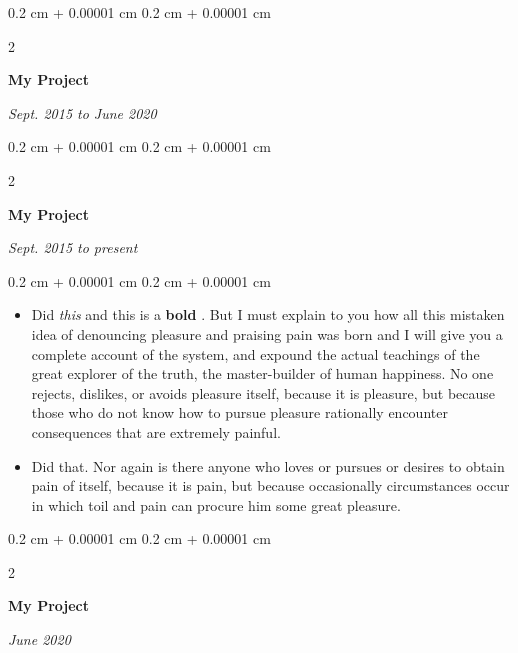 \documentclass[10pt, letterpaper]{article}
\newenvironment{highlights}{
    \begin{itemize}[
        topsep=0.10 cm,
        parsep=0.10 cm,
        partopsep=0pt,
        itemsep=0pt,
        leftmargin=0.4 cm + 10pt
    ]
}{
    \end{itemize}
} %
\newenvironment{onecolentry}{
    \begin{adjustwidth}{
        0.2 cm + 0.00001 cm
    }{
        0.2 cm + 0.00001 cm
    }
}{
    \end{adjustwidth}
} %
\newenvironment{twocolentry}[2][]{
    \onecolentry
    \def\secondColumn{#2}
    \setcolumnwidth{\fill, 4.5 cm}
    \begin{paracol}{2}
}{
    \switchcolumn \raggedleft \secondColumn
    \end{paracol}
    \endonecolentry
} %
\let\hrefWithoutArrow\href
\renewcommand{\href}[2]{\hrefWithoutArrow{#1}{\mbox{\ifthenelse{\equal{#2}{}}{ }{#2 }\raisebox{.15ex}{\footnotesize \faExternalLink*}}}}
\begin{document}
        \vspace{0.2 cm-3px}

        \begin{twocolentry}{
            
            
        \textit{Sept. 2015 to June 2020}}
            \textbf{My Project}
        \end{twocolentry}



        \vspace{0.2 cm-3px}

        \begin{twocolentry}{
            
            
        \textit{Sept. 2015 to present}}
            \textbf{My Project}
        \end{twocolentry}

        \vspace{0.10 cm-3px}
        \begin{onecolentry}
            \begin{highlights}
                \item Did \textit{this} and this is a \textbf{bold} \href{https://example.com}{link}. But I must explain to you how all this mistaken idea of denouncing pleasure and praising pain was born and I will give you a complete account of the system, and expound the actual teachings of the great explorer of the truth, the master-builder of human happiness. No one rejects, dislikes, or avoids pleasure itself, because it is pleasure, but because those who do not know how to pursue pleasure rationally encounter consequences that are extremely painful.
                \item Did that. Nor again is there anyone who loves or pursues or desires to obtain pain of itself, because it is pain, but because occasionally circumstances occur in which toil and pain can procure him some great pleasure.
            \end{highlights}
        \end{onecolentry}


        \vspace{0.2 cm-3px}

        \begin{twocolentry}{
            
            
        \textit{June 2020}}
            \textbf{My Project}
        \end{twocolentry}
\end{document}
